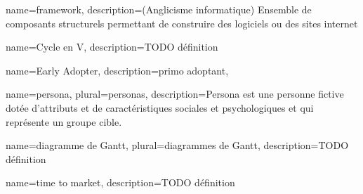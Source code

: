 
\begin{comment}
Glossaire : 
  Nouvelle entrée :
    \newglossaryentry{test} %
    {%
        name={test}, %
        description={<description>}, %
        plural={tests} %
    }
  Usage : 
    \gls{test} Retourne "test"
    \Gls{test} Retourne "Test"
    \glsplural{test} Retourne "tests"
    \Glsplural{test} Retourne "Tests"
        
Pour des mots utilisés fréquemment, petite astuce : 
	\newcommand{\bsr}{bilan scientifique régional} 
Ensuite, dans le contenu, il suffit d'y faire référence comme ceci : "\bsr{}"
\end{comment}


{%
    name={framework},
    description={(Anglicisme informatique) Ensemble de composants structurels permettant de construire des logiciels ou des sites internet}
}

{%
	name={Cycle en V},
	description={TODO définition}
}

{%
	name={Early Adopter},
	description={primo adoptant},
}

{
	name={persona},
	plural={personas},
	description={Persona est une personne fictive dotée d'attributs et de caractéristiques sociales et psychologiques et qui représente un groupe cible. }
}

{
	name={diagramme de Gantt},
	plural={diagrammes de Gantt},
	description={TODO définition}
}

{
	name={time to market},
	description={TODO définition}
}






